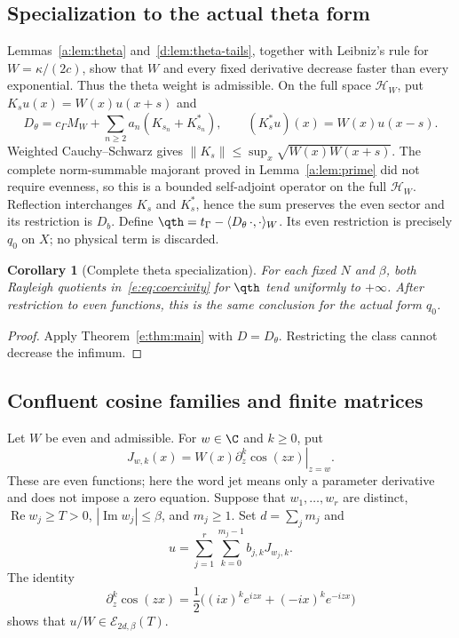 \documentclass[11pt,a4paper]{article}
\numberwithin{equation}{section}
\newtheorem{corollary}[theorem]{Corollary}
\theoremstyle{definition}\newtheorem{definition}[theorem]{Definition}
\theoremstyle{remark}\newtheorem{remark}[theorem]{Remark}
\newcommand{\HH}{\mathcal H_W}\newcommand{\XX}{X_W}\newcommand{\EE}{\mathcal E_{N,\beta}}
\newcommand{\tg}{t_\Gamma}\newcommand{\cg}{c_\Gamma}
\newcommand{\ip}[2]{\langle#1,#2\rangle}\newcommand{\norm}[1]{\lVert#1\rVert}\newcommand{\abs}[1]{\lvert#1\rvert}
\DeclareMathOperator{\Rea}{Re}\DeclareMathOperator{\Ima}{Im}
\begin{document}
\subsection{Specialization to the actual theta form}\label{e:sec:theta}
Lemmas~\ref{a:lem:theta} and~\ref{d:lem:theta-tails}, together with Leibniz's rule for $W=\kappa/(2c)$, show that $W$ and every fixed derivative decrease faster than every exponential. Thus the theta weight is admissible. On the full space $\HH$, put $K_su(x)=W(x)u(x+s)$ and
\[
 D_\theta=\cg M_W+\sum_{n\ge2}a_n(K_{s_n}+K_{s_n}^*),\qquad
 (K_s^*u)(x)=W(x)u(x-s).
\]
Weighted Cauchy--Schwarz gives $\norm{K_s}\le\sup_x\sqrt{W(x)W(x+s)}$. The complete norm-summable majorant proved in Lemma~\ref{a:lem:prime} did not require evenness, so this is a bounded self-adjoint operator on the full $\HH$. Reflection interchanges $K_s$ and $K_s^*$, hence the sum preserves the even sector and its restriction is $D_b$. Define $\qth=\tg-\ip{D_\theta\,\cdot}{\cdot}_W$. Its even restriction is precisely $q_0$ on $X$; no physical term is discarded.
\begin{corollary}[Complete theta specialization]\label{e:cor:theta}
For each fixed $N$ and $\beta$, both Rayleigh quotients in~\eqref{e:eq:coercivity} for $\qth$ tend uniformly to $+\infty$. After restriction to even functions, this is the same conclusion for the actual form $q_0$.
\end{corollary}
\begin{proof}
Apply Theorem~\ref{e:thm:main} with $D=D_\theta$. Restricting the class cannot decrease the infimum.
\end{proof}


\subsection{Confluent cosine families and finite matrices}\label{e:sec:cosine}

Let $W$ be even and admissible. For $w\in\C$ and $k\ge0$, put
\begin{equation}\label{e:eq:jets}
 J_{w,k}(x)=W(x)\left.\partial_z^k\cos(zx)\right|_{z=w}.
\end{equation}
These are even functions; here the word jet means only a parameter
derivative and does not impose a zero equation. Suppose that
$w_1,\ldots,w_r$ are distinct, $\Rea w_j\ge T>0$,
$|\Ima w_j|\le\beta$, and $m_j\ge1$. Set $d=\sum_jm_j$ and
\begin{equation}\label{e:eq:cosine-combination}
 u=\sum_{j=1}^r\sum_{k=0}^{m_j-1}b_{j,k}J_{w_j,k}.
\end{equation}
The identity
\begin{equation}\label{e:eq:jet-exp}
 \partial_z^k\cos(zx)=\frac12\bigl((ix)^ke^{izx}+(-ix)^ke^{-izx}\bigr)
\end{equation}
shows that $u/W\in\mathcal E_{2d,\beta}(T)$.
\end{document}
